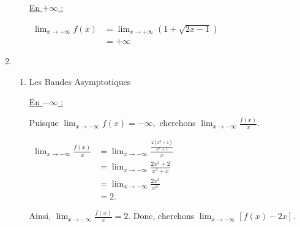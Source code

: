 \documentclass[12pt,a4paper]{article}
\begin{document}
\begin{enumerate}
\begin{enumerate}
                    \underline{En \( +\infty \) :}

                    \(
                    \begin{aligned}
                        \lim_{x \to +\infty} f(x) & = \lim_{x \to +\infty} \left( 1 + \sqrt{2x - 1} \right) \\
                                                  & = +\infty
                    \end{aligned}
                    \)

          \end{enumerate}

    \item
          \begin{enumerate}
              \item Les Bandes Asymptotiques

                    \underline{En \( -\infty \) :}

                    Puisque
                    \(
                    \lim_{x \to -\infty} f(x) = -\infty,
                    \)
                    cherchons
                    \(
                    \lim_{x \to -\infty} \frac{f(x)}{x}.
                    \)

                    \(
                    \begin{aligned}
                        \lim_{x \to -\infty} \frac{f(x)}{x} & = \lim_{x \to -\infty} \frac{\frac{2(x^3 + 1)}{x^2 + 1}}{x} \\
                                                            & = \lim_{x \to -\infty} \frac{2x^3 + 2}{x^3 + x}             \\
                                                            & = \lim_{x \to -\infty} \frac{2x^3}{x^3}                     \\
                                                            & = 2.
                    \end{aligned}
                    \)

                    Ainsi,
                    \(
                    \lim_{x \to -\infty} \frac{f(x)}{x} = 2.
                    \)
                    Donc, cherchons
                    \(
                    \lim_{x \to -\infty} \left[ f(x) - 2x \right].
                    \)


\end{enumerate}
\end{enumerate}
\end{document}
